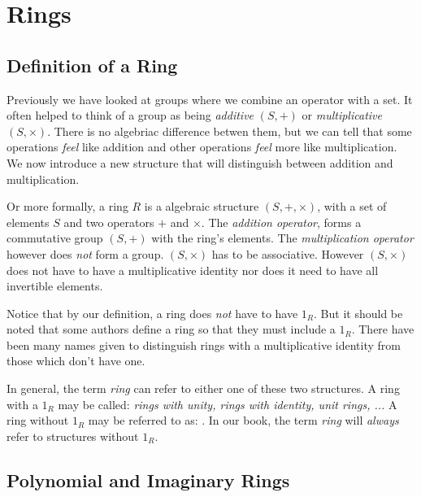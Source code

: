 
\chapter{Rings}




\section{Definition of a Ring}

Previously we have looked at groups where we combine an operator with a set. 
It often helped to think of a group as being \textit{additive} $(S, +)$ 
or \textit{multiplicative} $(S, \times)$. There is no algebriac difference betwen them, but we can 
tell that some operations \textit{feel} like addition and other operations \textit{feel} more 
like multiplication. We now introduce a new structure that will distinguish between addition 
and multiplication.


Or more formally, a ring $R$ is a algebraic structure $(S, +, \times)$,  
with a set of elements $S$ and two operators $+$ and $\times$. The \textit{addition operator}, 
forms a commutative group $(S,+)$ with the ring's elements. The \textit{multiplication operator} 
however does \textit{not} form a group. $(S,\times)$ has to be associative. However $(S,\times)$ does not 
have to have a multiplicative identity nor does it need to have all invertible elements. 


Notice that by our definition, a ring does \textit{not} have to have $1_R$. 
But it should be noted that some authors define a ring so that they must include a $1_R$.
There have been many names given to distinguish rings with a multiplicative identity from those 
which don't have one. 

In general, the term \textit{ring} can refer to either one of these two structures. 
A ring with a $1_R$ may be called: \textit{rings with unity, rings with identity, unit rings, ...}
A ring without $1_R$ may be referred to as: .
In our book, the term \textit{ring} will \textit{always} refer to structures without $1_R$. 




\section{Polynomial and Imaginary Rings}

